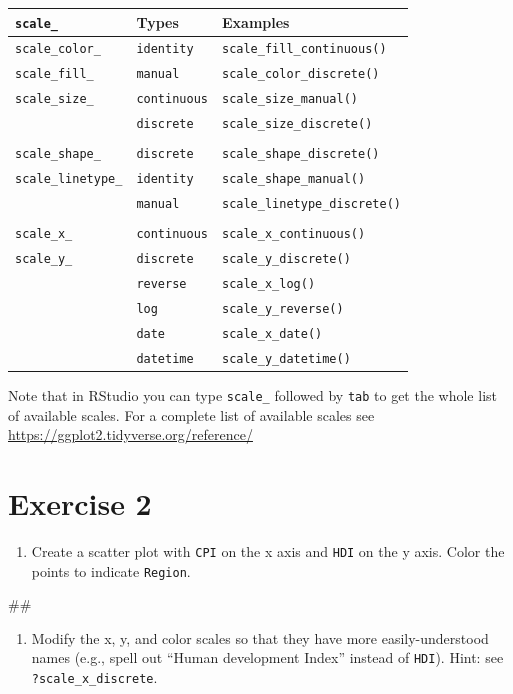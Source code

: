 \documentclass[]{book}
\newenvironment{Shaded}{\begin{snugshade}}{\end{snugshade}}
\newcommand{\NormalTok}[1]{#1}
\providecommand{\tightlist}{%
  \setlength{\itemsep}{0pt}\setlength{\parskip}{0pt}}
\begin{document}
\begin{longtable}[]{@{}lll@{}}
\toprule
\texttt{scale\_} & Types & Examples\tabularnewline
\midrule
\endhead
\texttt{scale\_color\_} & \texttt{identity} &
\texttt{scale\_fill\_continuous()}\tabularnewline
\texttt{scale\_fill\_} & \texttt{manual} &
\texttt{scale\_color\_discrete()}\tabularnewline
\texttt{scale\_size\_} & \texttt{continuous} &
\texttt{scale\_size\_manual()}\tabularnewline
& \texttt{discrete} & \texttt{scale\_size\_discrete()}\tabularnewline
& &\tabularnewline
\texttt{scale\_shape\_} & \texttt{discrete} &
\texttt{scale\_shape\_discrete()}\tabularnewline
\texttt{scale\_linetype\_} & \texttt{identity} &
\texttt{scale\_shape\_manual()}\tabularnewline
& \texttt{manual} & \texttt{scale\_linetype\_discrete()}\tabularnewline
& &\tabularnewline
\texttt{scale\_x\_} & \texttt{continuous} &
\texttt{scale\_x\_continuous()}\tabularnewline
\texttt{scale\_y\_} & \texttt{discrete} &
\texttt{scale\_y\_discrete()}\tabularnewline
& \texttt{reverse} & \texttt{scale\_x\_log()}\tabularnewline
& \texttt{log} & \texttt{scale\_y\_reverse()}\tabularnewline
& \texttt{date} & \texttt{scale\_x\_date()}\tabularnewline
& \texttt{datetime} & \texttt{scale\_y\_datetime()}\tabularnewline
\bottomrule
\end{longtable}

Note that in RStudio you can type \texttt{scale\_} followed by
\texttt{tab} to get the whole list of available scales. For a complete
list of available scales see
\url{https://ggplot2.tidyverse.org/reference/}

\section{Exercise 2}\label{exercise-2-1}

\begin{enumerate}
\def\labelenumi{\arabic{enumi}.}
\tightlist
\item
  Create a scatter plot with \texttt{CPI} on the x axis and \texttt{HDI}
  on the y axis. Color the points to indicate \texttt{Region}.
\end{enumerate}

\begin{Shaded}
\begin{Highlighting}[]
\NormalTok{## }
\end{Highlighting}
\end{Shaded}

\begin{enumerate}
\def\labelenumi{\arabic{enumi}.}
\setcounter{enumi}{1}
\tightlist
\item
  Modify the x, y, and color scales so that they have more
  easily-understood names (e.g., spell out ``Human development Index''
  instead of \texttt{HDI}). Hint: see \texttt{?scale\_x\_discrete}.
\end{enumerate}
\end{document}
